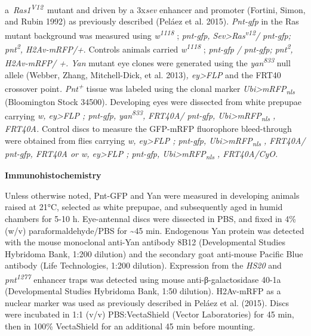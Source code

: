 a~\emph{Ras1\textsuperscript{V12}}~mutant and driven by a 3x\emph{sev} enhancer and promoter (Fortini, Simon, and Rubin 1992) as previously described (Peláez et al. 2015). \emph{Pnt-gfp} in the Ras mutant background was measured using \emph{w\textsuperscript{1118 }}; \emph{pnt-gfp, Sev\textgreater{}Ras\textsuperscript{v12}/ pnt-gfp; pnt\textsuperscript{2}, H2Av-mRFP/+}. Controls animals carried \emph{w\textsuperscript{1118 }}; \emph{pnt-gfp} \emph{/ pnt-gfp; pnt\textsuperscript{2}, H2Av-mRFP/ +. Yan} mutant eye clones were generated using the \emph{yan\textsuperscript{833}} null allele (Webber, Zhang, Mitchell-Dick, et al. 2013)\emph{, ey\textgreater{}FLP} and the FRT40 crossover point\emph{. Pnt\textsuperscript{+}} tissue was labeled using the clonal marker \emph{Ubi\textgreater{}mRFP\textsubscript{nls}} (Bloomington Stock 34500). Developing eyes were dissected from white prepupae carrying \emph{w, ey\textgreater{}FLP ; pnt-gfp, yan\textsuperscript{833}, FRT40A/ pnt-gfp, Ubi\textgreater{}mRFP\textsubscript{nls} , FRT40A.} Control discs to measure the GFP-mRFP fluorophore bleed-through were obtained from flies carrying \emph{w, ey\textgreater{}FLP ; pnt-gfp, Ubi\textgreater{}mRFP\textsubscript{nls} , FRT40A/ pnt-gfp, FRT40A or w, ey\textgreater{}FLP ; pnt-gfp, Ubi\textgreater{}mRFP\textsubscript{nls} , FRT40A/CyO.}

\textbf{Immunohistochemistry}

Unless otherwise noted, Pnt-GFP and Yan were measured in developing animals raised at 21°C, selected as white prepupae, and subsequently aged in humid chambers for 5-10 h. Eye-antennal discs were dissected in PBS, and fixed in 4\% (w/v) paraformaldehyde/PBS for \textasciitilde{}45 min. Endogenous Yan protein was detected with the mouse monoclonal anti-Yan antibody 8B12 (Developmental Studies Hybridoma Bank, 1:200 dilution) and the secondary goat anti-mouse Pacific Blue antibody (Life Technologies, 1:200 dilution). Expression from the \emph{HS20} and \emph{pnt\textsuperscript{1277}} enhancer traps was detected using mouse anti-β-galactosidase 40-1a (Developmental Studies Hybridoma Bank, 1:50 dilution). H2Av-mRFP as a nuclear marker was used as previously described in Peláez et al. (2015). Discs were incubated in 1:1 (v/v) PBS:VectaShield (Vector Laboratories) for 45 min, then in 100\% VectaShield for an additional 45 min before mounting.


